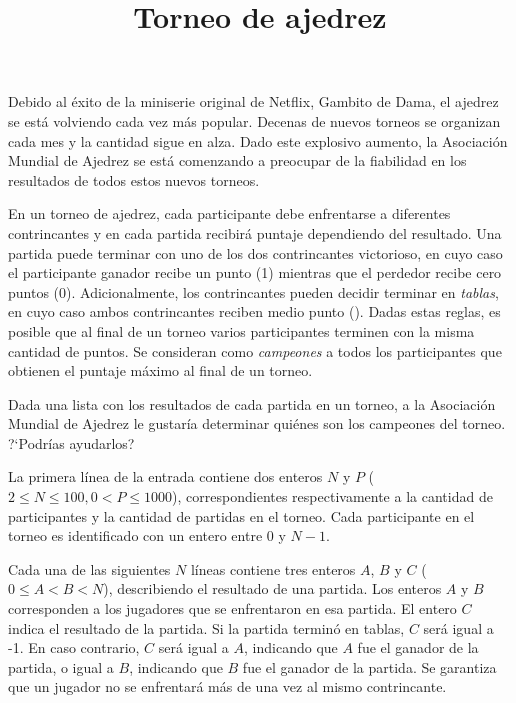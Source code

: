 \documentclass{oci}
\title{Torneo de ajedrez}
\begin{document}
\begin{problemDescription}
  Debido al éxito de la miniserie original de Netflix, Gambito de Dama, el ajedrez
  se está volviendo cada vez más popular.
  Decenas de nuevos torneos se organizan cada mes y la cantidad sigue en alza.
  Dado este explosivo aumento, la Asociación Mundial de Ajedrez se está comenzando a preocupar
  de la fiabilidad en los resultados de todos estos nuevos torneos.

  En un torneo de ajedrez, cada participante debe enfrentarse a diferentes contrincantes y en cada
  partida recibirá puntaje dependiendo del resultado.
  Una partida puede terminar con uno de los dos contrincantes victorioso, en cuyo caso el
  participante ganador recibe un punto (1) mientras que el perdedor recibe cero puntos (0).
  Adicionalmente, los contrincantes pueden decidir terminar en \emph{tablas}, en cuyo caso ambos
  contrincantes reciben medio punto ().
  Dadas estas reglas, es posible que al final de un torneo varios participantes terminen con
  la misma cantidad de puntos.
  Se consideran como \emph{campeones} a todos los participantes que obtienen el puntaje máximo
  al final de un torneo.

  Dada una lista con los resultados de cada partida en un torneo, a la Asociación
  Mundial de Ajedrez le gustaría determinar quiénes son los campeones del torneo.
  ?`Podrías ayudarlos?
\end{problemDescription}

\begin{inputDescription}
  La primera línea de la entrada contiene dos enteros $N$ y $P$
  ($2 \leq N \leq 100, 0 < P \leq 1000$),
  correspondientes respectivamente a la cantidad de participantes y la cantidad de partidas
  en el torneo.
  Cada participante en el torneo es identificado con un entero entre 0 y $N-1$.

  Cada una de las siguientes $N$ líneas contiene tres enteros $A$, $B$ y $C$
  ($0\leq A < B < N$), describiendo el resultado de una partida.
  Los enteros $A$ y $B$ corresponden a los jugadores que se enfrentaron en esa partida.
  El entero $C$ indica el resultado de la partida.
  Si la partida terminó en tablas, $C$ será igual a {-1}.
  En caso contrario, $C$ será igual a $A$, indicando que $A$ fue el ganador de la partida, o igual
  a $B$, indicando que $B$ fue el ganador de la partida.
  Se garantiza que un jugador no se enfrentará más de una vez al mismo contrincante.
\end{inputDescription}
\end{document}
